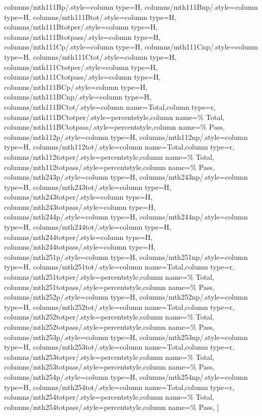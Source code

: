 \documentclass[varwidth]{standalone}
\begin{document}
{    columns/mth111Bp/.style={column type=H},
    columns/mth111Bnp/.style={column type=H},
    columns/mth111Btot/.style={column type=H},
    columns/mth111Btotper/.style={column type=H},
    columns/mth111Btotpass/.style={column type=H},
    columns/mth111Cp/.style={column type=H},
    columns/mth111Cnp/.style={column type=H},
    columns/mth111Ctot/.style={column type=H},
    columns/mth111Ctotper/.style={column type=H},
    columns/mth111Ctotpass/.style={column type=H},
    columns/mth111BCp/.style={column type=H},
    columns/mth111BCnp/.style={column type=H},
    columns/mth111BCtot/.style={column name=Total,column type=r},
    columns/mth111BCtotper/.style={percentstyle,column name=\% Total},
    columns/mth111BCtotpass/.style={percentstyle,column name=\% Pass},
    columns/mth112p/.style={column type=H},
    columns/mth112np/.style={column type=H},
    columns/mth112tot/.style={column name=Total,column type=r},
    columns/mth112totper/.style={percentstyle,column name=\% Total},
    columns/mth112totpass/.style={percentstyle,column name=\% Pass},
    columns/mth243p/.style={column type=H},
    columns/mth243np/.style={column type=H},
    columns/mth243tot/.style={column type=H},
    columns/mth243totper/.style={column type=H},
    columns/mth243totpass/.style={column type=H},
    columns/mth244p/.style={column type=H},
    columns/mth244np/.style={column type=H},
    columns/mth244tot/.style={column type=H},
    columns/mth244totper/.style={column type=H},
    columns/mth244totpass/.style={column type=H},
    columns/mth251p/.style={column type=H},
    columns/mth251np/.style={column type=H},
    columns/mth251tot/.style={column name=Total,column type=r},
    columns/mth251totper/.style={percentstyle,column name=\% Total},
    columns/mth251totpass/.style={percentstyle,column name=\% Pass},
    columns/mth252p/.style={column type=H},
    columns/mth252np/.style={column type=H},
    columns/mth252tot/.style={column name=Total,column type=r},
    columns/mth252totper/.style={percentstyle,column name=\% Total},
    columns/mth252totpass/.style={percentstyle,column name=\% Pass},
    columns/mth253p/.style={column type=H},
    columns/mth253np/.style={column type=H},
    columns/mth253tot/.style={column name=Total,column type=r},
    columns/mth253totper/.style={percentstyle,column name=\% Total},
    columns/mth253totpass/.style={percentstyle,column name=\% Pass},
    columns/mth254p/.style={column type=H},
    columns/mth254np/.style={column type=H},
    columns/mth254tot/.style={column name=Total,column type=r},
    columns/mth254totper/.style={percentstyle,column name=\% Total},
    columns/mth254totpass/.style={percentstyle,column name=\% Pass},
]{\diversitydata}
}
\end{document}
